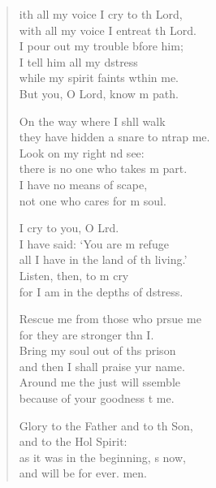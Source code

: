 \begin{verse}
\begin{patverse}
ith all my voice I cry to th Lord,\Med\\
    with all my voice I entreat th Lord.\\
I pour out my trouble bfore him;\Med\\
    I tell him all my d\pointup{\i}stress\\
while my spirit faints w\pointup{\i}thin me.\Med\\
    But you, O Lord, know m path.

On the way where I shll walk\Med\\
    they have hidden a snare to ntrap me.\\
Look on my right nd see:\Med\\
    there is no one who takes m part.\\
I have no means of scape,\Med\\
    not one who cares for m soul.

I cry to you, O Lrd.\Flex\\
    I have said: ‘You are m refuge\Med\\
    all I have in the land of th living.’\\
Listen, then, to m cry\Med\\
    for I am in the depths of d\pointup{\i}stress.

Rescue me from those who prsue me\Med\\
    for they are stronger thn I.\\
Bring my soul out of th\pointup{\i}s prison\Med\\
    and then I shall praise yur name.\\
Around me the just will ssemble\Med\\
    because of your goodness t me.

Glory to the Father and to th Son,\Med\\
    and to the Hol Spirit:\\
as it was in the beginning, \pointup{\i}s now,\Med\\
    and will be for ever. men.
\end{patverse}
\end{verse}
